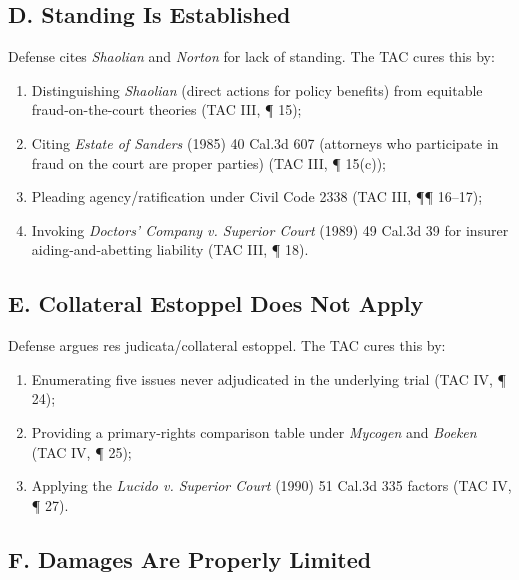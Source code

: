 \subsection{D. Standing Is Established}\label{d.-standing-is-established}

Defense cites \emph{Shaolian} and \emph{Norton} for lack of standing. The TAC cures this by:

\begin{enumerate}
\def\labelenumi{\arabic{enumi}.}
\tightlist
\item
  Distinguishing \emph{Shaolian} (direct actions for policy benefits) from equitable fraud-on-the-court theories (TAC \textsection{}III, ¶ 15);
\item
  Citing \emph{Estate of Sanders} (1985) 40 Cal.3d 607 (attorneys who participate in fraud on the court are proper parties) (TAC \textsection{}III, ¶ 15(c));
\item
  Pleading agency/ratification under Civil Code \textsection{} 2338 (TAC \textsection{}III, ¶¶ 16--17);
\item
  Invoking \emph{Doctors' Company v. Superior Court} (1989) 49 Cal.3d 39 for insurer aiding-and-abetting liability (TAC \textsection{}III, ¶ 18).
\end{enumerate}

\subsection{E. Collateral Estoppel Does Not Apply}\label{e.-collateral-estoppel-does-not-apply}

Defense argues res judicata/collateral estoppel. The TAC cures this by:

\begin{enumerate}
\def\labelenumi{\arabic{enumi}.}
\tightlist
\item
  Enumerating five issues never adjudicated in the underlying trial (TAC \textsection{}IV, ¶ 24);
\item
  Providing a primary-rights comparison table under \emph{Mycogen} and \emph{Boeken} (TAC \textsection{}IV, ¶ 25);
\item
  Applying the \emph{Lucido v. Superior Court} (1990) 51 Cal.3d 335 factors (TAC \textsection{}IV, ¶ 27).
\end{enumerate}

\subsection{F. Damages Are Properly Limited}\label{f.-damages-are-properly-limited}

